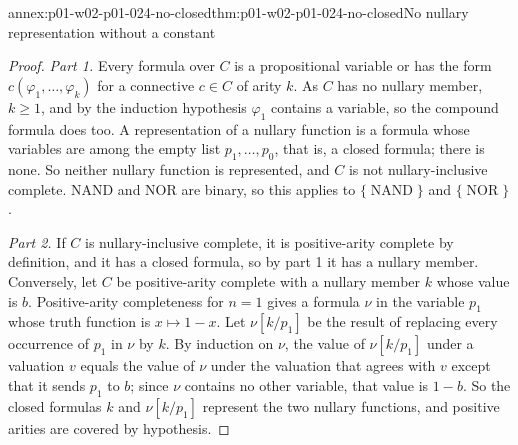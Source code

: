 \begin{annexitem}{annex:p01-w02-p01-024-no-closed}{thm:p01-w02-p01-024-no-closed}{No nullary representation without a constant}
\begin{proof}
\emph{Part 1.}  Every formula over \(C\) is a propositional variable or has
the form \(c(\varphi_1,\ldots,\varphi_k)\) for a connective \(c\in C\) of
arity \(k\).  As \(C\) has no nullary member, \(k\geq1\), and by the
induction hypothesis \(\varphi_1\) contains a variable, so the compound
formula does too.  A representation of a nullary function is a formula
whose variables are among the empty list \(p_1,\ldots,p_0\), that is, a
closed formula; there is none.  So neither nullary function is
represented, and \(C\) is not nullary-inclusive complete.  NAND and NOR are
binary, so this applies to \(\{\operatorname{NAND}\}\) and
\(\{\operatorname{NOR}\}\).

\emph{Part 2.}  If \(C\) is nullary-inclusive complete, it is positive-arity
complete by definition, and it has a closed formula, so by part 1 it has a
nullary member.  Conversely, let \(C\) be positive-arity complete with a
nullary member \(k\) whose value is \(b\).  Positive-arity completeness for
\(n=1\) gives a formula \(\nu\) in the variable \(p_1\) whose truth
function is \(x\mapsto1-x\).  Let \(\nu[k/p_1]\) be the result of replacing
every occurrence of \(p_1\) in \(\nu\) by \(k\).  By induction on \(\nu\),
the value of \(\nu[k/p_1]\) under a valuation \(v\) equals the value of
\(\nu\) under the valuation that agrees with \(v\) except that it sends
\(p_1\) to \(b\); since \(\nu\) contains no other variable, that value is
\(1-b\).  So the closed formulas \(k\) and \(\nu[k/p_1]\) represent the two
nullary functions, and positive arities are covered by hypothesis.
\end{proof}
\end{annexitem}

